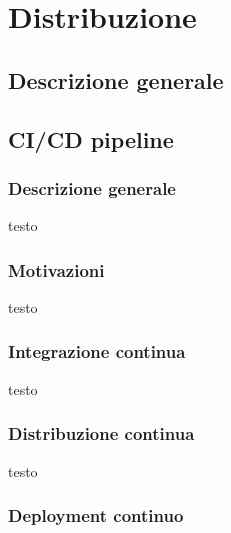 \chapter{Distribuzione}
\section{Descrizione generale}

\section{CI/CD pipeline}
\subsection{Descrizione generale}
testo
\subsection{Motivazioni}
testo
\subsection{Integrazione continua}
testo
\subsection{Distribuzione continua}
testo
\subsection{Deployment continuo}
